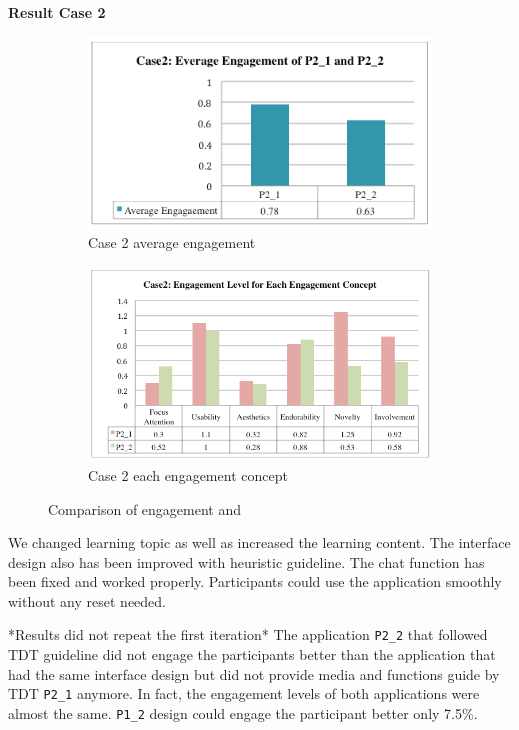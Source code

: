 \textbf{Result Case 2} 
\begin{figure}[!hbt]\centering
    \begin{subfigure}{0.7\textwidth}
 \includegraphics[width=\textwidth]{case2a}
 \caption{Case 2 average engagement}
    \end{subfigure}\hspace{0.1\textwidth}
    \begin{subfigure}{1.0\textwidth}
\includegraphics[width=\textwidth]{case2b}
  \caption{Case 2 each engagement concept}
    \end{subfigure}
    \caption{Comparison of engagement   and }
\end{figure}

We changed learning topic as well as increased the learning content. The interface design also has been improved with heuristic guideline. The chat function has been fixed and worked properly. Participants could use the application smoothly without any reset needed. 

*Results did not repeat the first iteration* 
The application \verb|P2_2| that followed TDT guideline did not engage the participants better than the application that had the same interface design but did not provide media and functions guide by TDT \verb|P2_1| anymore. In fact, the engagement levels of both applications were almost the same. \verb|P1_2| design could engage the participant better only 7.5\%. 

